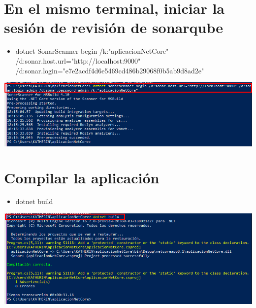 \section{ En el mismo terminal, iniciar la sesión de revisión de sonarqube } 
\begin{itemize}
    \item dotnet SonarScanner begin /k:"aplicacionNetCore" /d:sonar.host.url="http://localhost:9000" /d:sonar.login="e7e2acdf4d6e5469cd486b29068f0b5ab9d8ad2e"
\end{itemize}
\begin{center}
\includegraphics[width=\columnwidth]{images/13}\newline
\end{center}
\section{ Compilar la aplicación } 
\begin{itemize}
    \item dotnet build
\end{itemize}
\begin{center}
\includegraphics[width=\columnwidth]{images/14}\newline
\end{center}
